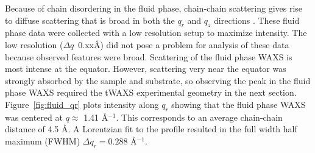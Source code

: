 Because of chain disordering in the fluid phase, chain-chain scattering
gives rise to diffuse scattering that is broad in both the $q_r$ and $q_z$ directions \cite{ref:Mills08}. 
These fluid phase data were collected with a low resolution setup to maximize
intensity. The low resolution (${\Delta}q$~0.xx\AA) did not pose a problem for analysis of these 
data because observed features were broad.  Scattering of the fluid phase WAXS
is most intense at the equator. However, scattering very near the equator
was strongly absorbed by the sample and substrate, so observing the 
peak in the fluid phase WAXS required the tWAXS experimental 
geometry in the next section.  
Figure~\ref{fig:fluid_qr} plots intensity along $q_r$ showing that
the fluid phase WAXS was centered at $q \approx$ 1.41 \AA$^{-1}$. 
This corresponds to an average chain-chain distance of 4.5 \AA. 
A Lorentzian fit to the profile resulted in the full width half maximum
(FWHM) $\Delta q_r=0.288$ \AA$^{-1}$.

